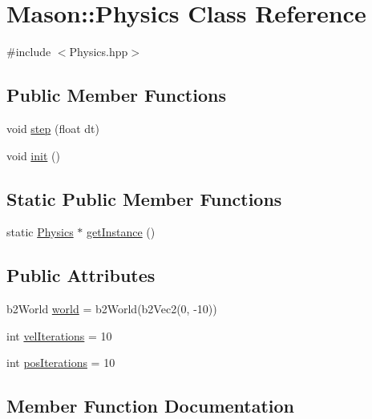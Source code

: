 \hypertarget{class_mason_1_1_physics}{}\section{Mason\+:\+:Physics Class Reference}
\label{class_mason_1_1_physics}


{\ttfamily \#include $<$Physics.\+hpp$>$}

\subsection*{Public Member Functions}
\begin{DoxyCompactItemize}
\item 
void \hyperlink{class_mason_1_1_physics_ad625f1dea595f7b723003d54f997a518}{step} (float dt)
\item 
void \hyperlink{class_mason_1_1_physics_abc4560255c493a7fd543dd6730e4f826}{init} ()
\end{DoxyCompactItemize}
\subsection*{Static Public Member Functions}
\begin{DoxyCompactItemize}
\item 
static \hyperlink{class_mason_1_1_physics}{Physics} $\ast$ \hyperlink{class_mason_1_1_physics_aba5aeb438d394e23ebd74bdc4aa716c2}{get\+Instance} ()
\end{DoxyCompactItemize}
\subsection*{Public Attributes}
\begin{DoxyCompactItemize}
\item 
b2\+World \hyperlink{class_mason_1_1_physics_a7740dc3712e10eb4258774b76daeb2f6}{world} = b2\+World(b2\+Vec2(0, -\/10))
\item 
int \hyperlink{class_mason_1_1_physics_ab93e9c5caf8cb0964ceedc2161fac86d}{vel\+Iterations} = 10
\item 
int \hyperlink{class_mason_1_1_physics_a43a4f23b2ee62ad20c3ed54a7c75a468}{pos\+Iterations} = 10
\end{DoxyCompactItemize}


\subsection{Member Function Documentation}
\hypertarget{class_mason_1_1_physics_aba5aeb438d394e23ebd74bdc4aa716c2}{}\label{class_mason_1_1_physics_aba5aeb438d394e23ebd74bdc4aa716c2} 
